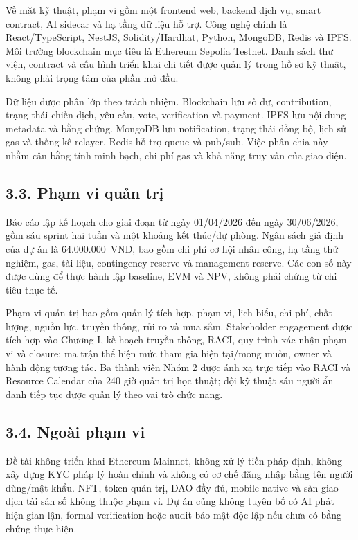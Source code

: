 Về mặt kỹ thuật, phạm vi gồm một frontend web, backend dịch vụ, smart contract, AI sidecar và hạ tầng dữ liệu hỗ trợ. Công nghệ chính là React/TypeScript, NestJS, Solidity/Hardhat, Python, MongoDB, Redis và IPFS. Môi trường blockchain mục tiêu là Ethereum Sepolia Testnet. Danh sách thư viện, contract và cấu hình triển khai chi tiết được quản lý trong hồ sơ kỹ thuật, không phải trọng tâm của phần mở đầu.

Dữ liệu được phân lớp theo trách nhiệm. Blockchain lưu số dư, contribution, trạng thái chiến dịch, yêu cầu, vote, verification và payment. IPFS lưu nội dung metadata và bằng chứng. MongoDB lưu notification, trạng thái đồng bộ, lịch sử gas và thống kê relayer. Redis hỗ trợ queue và pub/sub. Việc phân chia này nhằm cân bằng tính minh bạch, chi phí gas và khả năng truy vấn của giao diện.

\subsection*{3.3. Phạm vi quản trị}

Báo cáo lập kế hoạch cho giai đoạn từ ngày 01/04/2026 đến ngày 30/06/2026, gồm sáu sprint hai tuần và một khoảng kết thúc/dự phòng. Ngân sách giả định của dự án là 64.000.000~VNĐ, bao gồm chi phí cơ hội nhân công, hạ tầng thử nghiệm, gas, tài liệu, contingency reserve và management reserve. Các con số này được dùng để thực hành lập baseline, EVM và NPV, không phải chứng từ chi tiêu thực tế.

Phạm vi quản trị bao gồm quản lý tích hợp, phạm vi, lịch biểu, chi phí, chất lượng, nguồn lực, truyền thông, rủi ro và mua sắm. Stakeholder engagement được tích hợp vào Chương I, kế hoạch truyền thông, RACI, quy trình xác nhận phạm vi và closure; ma trận thể hiện mức tham gia hiện tại/mong muốn, owner và hành động tương tác. Ba thành viên Nhóm 2 được ánh xạ trực tiếp vào RACI và Resource Calendar của 240 giờ quản trị học thuật; đội kỹ thuật sáu người ẩn danh tiếp tục được quản lý theo vai trò chức năng.

\subsection*{3.4. Ngoài phạm vi}

Đề tài không triển khai Ethereum Mainnet, không xử lý tiền pháp định, không xây dựng KYC pháp lý hoàn chỉnh và không có cơ chế đăng nhập bằng tên người dùng/mật khẩu. NFT, token quản trị, DAO đầy đủ, mobile native và sàn giao dịch tài sản số không thuộc phạm vi. Dự án cũng không tuyên bố có AI phát hiện gian lận, formal verification hoặc audit bảo mật độc lập nếu chưa có bằng chứng thực hiện.

